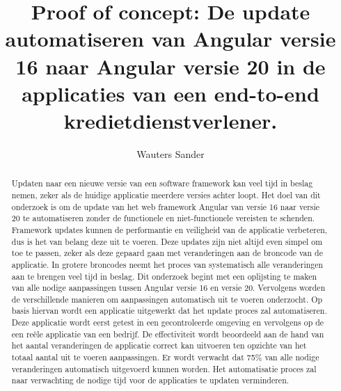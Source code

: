 \documentclass{hogent-article}
\title{Proof of concept: De update automatiseren van Angular versie 16 naar Angular versie 20 in de applicaties van een end-to-end kredietdienstverlener.}
\author{Wauters Sander}
\begin{document}
\begin{abstract}

Updaten naar een nieuwe versie van een software framework kan veel tijd in beslag nemen, zeker als de huidige applicatie meerdere versies achter loopt.
Het doel van dit onderzoek is om de update van het web framework Angular van versie 16 naar versie 20 te automatiseren zonder de functionele en niet-functionele vereisten te schenden.
Framework updates kunnen de performantie en veiligheid van de applicatie verbeteren, dus is het van belang deze uit te voeren.
Deze updates zijn niet altijd even simpel om toe te passen, zeker als deze gepaard gaan met veranderingen aan de broncode van de applicatie.
In grotere broncodes neemt het proces van systematisch alle veranderingen aan te brengen veel tijd in beslag.
Dit onderzoek begint met een oplijsting te maken van alle nodige aanpassingen tussen Angular versie 16 en versie 20.
Vervolgens worden de verschillende manieren om aanpassingen automatisch uit te voeren onderzocht.
Op basis hiervan wordt een applicatie uitgewerkt dat het update proces zal automatiseren.
Deze applicatie wordt eerst getest in een gecontroleerde omgeving en vervolgens op de een reële applicatie van een bedrijf.
De effectiviteit wordt beoordeeld aan de hand van het aantal veranderingen de applicatie correct kan uitvoeren ten opzichte van het totaal aantal uit te voeren aanpassingen.
Er wordt verwacht dat 75\% van alle nodige veranderingen automatisch uitgevoerd kunnen worden.
Het automatisatie proces zal naar verwachting de nodige tijd voor de applicaties te updaten verminderen.

\end{abstract}

\tableofcontents



\printbibliography[heading=bibintoc]
\end{document}

